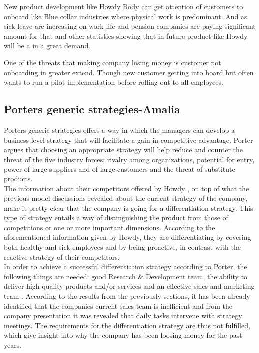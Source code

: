 \noindent New product development like Howdy Body can get attention of customers to onboard like Blue collar industries where physical work is predominant. And as sick leave are increasing on work life and pension companies are paying significant amount for that and other statistics showing that in future product like Howdy will be a in a great demand.

\noindent One of the threats that making company losing money is customer not onboarding in greater extend. Though new customer getting into board but often wants to run a pilot implementation before rolling out to all employees.

\subsection{Porters generic strategies-Amalia}
Porters generic strategies offers a way in which the managers can develop a business-level strategy that will facilitate a gain in competitive advantage\cite[p.190]{jones_george_2013}. Porter argues that choosing an appropriate strategy will help reduce and counter the threat of the five industry forces: rivalry among organizations, potential for entry, power of large suppliers and of large customers and the threat of substitute products\cite[p.189-190]{jones_george_2013}.\\
\noindent The information about their competitors offered by Howdy \cite{Extrainfo}, on top of what the previous model discussions revealed about the current strategy of the company, make it pretty clear that the company is going for a differentiation strategy. This type of strategy entails a way of distinguishing the product from those of competitions or one or more important dimensions\cite[p.191]{jones_george_2013}. According to the aforementioned information given by Howdy, they are differentiating by covering both healthy and sick employees and by being proactive, in contrast with the reactive strategy of their competitors. \\
\noindent In order to achieve a successful differentiation strategy according to Porter, the following things are needed: good Research \& Development team, the ability to deliver high-quality products and/or services and an effective sales and marketing team \cite{mind_tools_porter}. According to the results from the previously sections, it has been already identified that the companies current sales team is inefficient and from the company presentation\cite[s.11]{oneofthepresentations} it was revealed that daily tasks intervene with strategy meetings. The requirements for the differentiation strategy are thus not  fulfilled, which give insight into why the company has been loosing money for the past years. 


